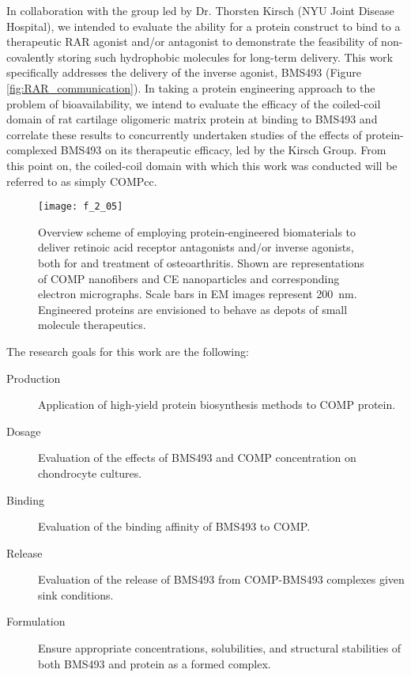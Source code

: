 \begin{refsection}
In collaboration with the group led by Dr. Thorsten Kirsch (NYU Joint Disease
Hospital), we intended to evaluate the ability for a protein construct to bind
to a therapeutic RAR agonist and/or antagonist to demonstrate the feasibility of
non-covalently storing such hydrophobic molecules for long-term delivery. This
work specifically addresses the delivery of the inverse agonist, BMS493 (Figure
\ref{fig:RAR_communication}). In taking a protein engineering approach to the
problem of bioavailability, we intend to evaluate the efficacy of the
coiled-coil domain of rat cartilage oligomeric matrix protein at binding to
BMS493 and correlate these results to concurrently undertaken 
studies of the effects of protein-complexed BMS493 on its therapeutic efficacy,
led by the Kirsch Group. From this point on, the coiled-coil domain with which
this work was conducted will be referred to as simply COMPcc.
\begin{figure}[h!] \centering \texttt{[image: f\_2\_05]}
    \caption{Overview scheme of employing protein-engineered biomaterials to
        deliver retinoic acid receptor antagonists and/or inverse agonists, both
        for  and  treatment of osteoarthritis.
        Shown are representations of COMP nanofibers and CE nanoparticles and
        corresponding electron micrographs. Scale bars in EM images represent
        \SI{200}{\nm}. Engineered proteins are envisioned to behave as depots of
    small molecule therapeutics.}\label{fig:research_intention} \end{figure}
The research goals for this work are the following:
\begin{description}
    \item[Production] Application of high-yield protein biosynthesis methods to
        COMP protein.
    \item[Dosage] Evaluation of the effects of BMS493 and COMP concentration on
         chondrocyte cultures.
    \item[Binding] Evaluation of the binding affinity of BMS493 to COMP.
    \item[Release] Evaluation of the release of BMS493 from COMP-BMS493
        complexes given sink conditions.
    \item[Formulation] Ensure appropriate concentrations, solubilities, and
        structural stabilities of both BMS493 and protein as a formed complex.

\end{description}
\end{refsection}
